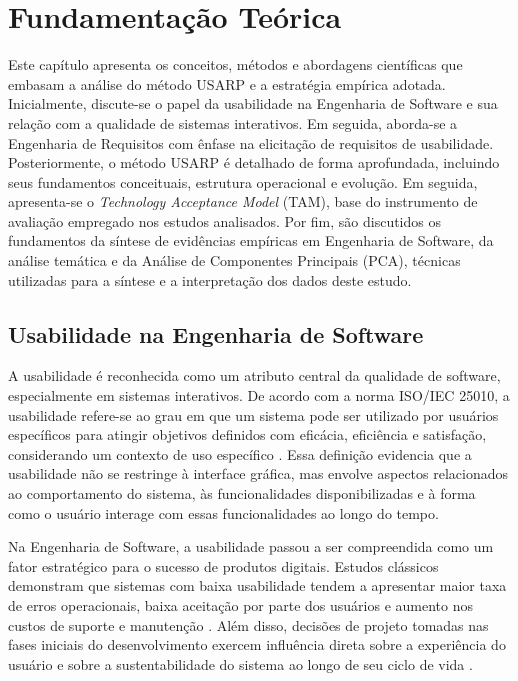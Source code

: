 \chapter{Fundamentação Teórica}
\label{cap:fundamentacao-teorica}

Este capítulo apresenta os conceitos, métodos e abordagens científicas que embasam a análise do método USARP e a estratégia empírica adotada. Inicialmente, discute-se o papel da usabilidade na Engenharia de Software e sua relação com a qualidade de sistemas interativos. Em seguida, aborda-se a Engenharia de Requisitos com ênfase na elicitação de requisitos de usabilidade. Posteriormente, o método USARP é detalhado de forma aprofundada, incluindo seus fundamentos conceituais, estrutura operacional e evolução. Em seguida, apresenta-se o \textit{Technology Acceptance Model} (TAM), base do instrumento de avaliação empregado nos estudos analisados. Por fim, são discutidos os fundamentos da síntese de evidências empíricas em Engenharia de Software, da análise temática e da Análise de Componentes Principais (PCA), técnicas utilizadas para a síntese e a interpretação dos dados deste estudo.

\section{Usabilidade na Engenharia de Software}

A usabilidade é reconhecida como um atributo central da qualidade de software, especialmente em sistemas interativos. De acordo com a norma ISO/IEC 25010, a usabilidade refere-se ao grau em que um sistema pode ser utilizado por usuários específicos para atingir objetivos definidos com eficácia, eficiência e satisfação, considerando um contexto de uso específico \cite{iso25010}. Essa definição evidencia que a usabilidade não se restringe à interface gráfica, mas envolve aspectos relacionados ao comportamento do sistema, às funcionalidades disponibilizadas e à forma como o usuário interage com essas funcionalidades ao longo do tempo.

Na Engenharia de Software, a usabilidade passou a ser compreendida como um fator estratégico para o sucesso de produtos digitais. Estudos clássicos demonstram que sistemas com baixa usabilidade tendem a apresentar maior taxa de erros operacionais, baixa aceitação por parte dos usuários e aumento nos custos de suporte e manutenção \cite{nielsen1993}. Além disso, decisões de projeto tomadas nas fases iniciais do desenvolvimento exercem influência direta sobre a experiência do usuário e sobre a sustentabilidade do sistema ao longo de seu ciclo de vida \cite{preece2015}.

